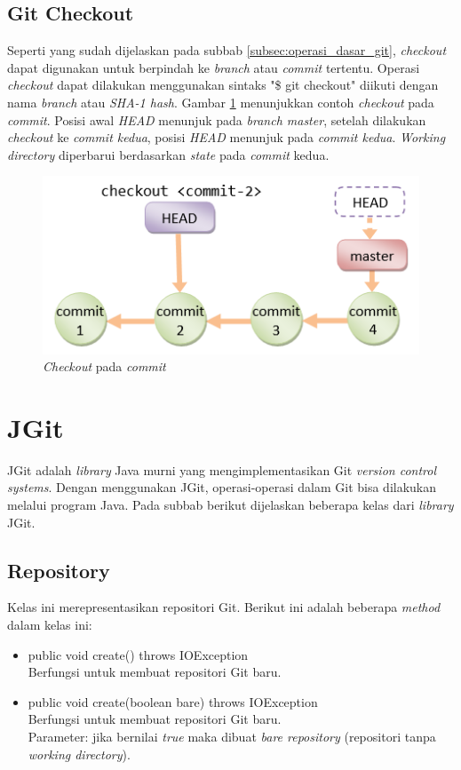 \subsection{Git Checkout}
Seperti yang sudah dijelaskan pada subbab \ref{subsec:operasi_dasar_git}, \textit{checkout} dapat digunakan untuk berpindah ke \textit{branch} atau \textit{commit} tertentu. Operasi \textit{checkout} dapat dilakukan menggunakan sintaks "\$ git checkout" diikuti dengan nama \textit{branch} atau \textit{SHA-1 hash}. Gambar \ref{fig:git_checkout} menunjukkan contoh \textit{checkout} pada \textit{commit}. Posisi awal \textit{HEAD} menunjuk pada \textit{branch master}, setelah dilakukan \textit{checkout} ke \textit{commit kedua}, posisi \textit{HEAD} menunjuk pada \textit{commit kedua}. \textit{Working directory} diperbarui berdasarkan \textit{state} pada \textit{commit} kedua. 
\begin{figure}[H]
	\centering
		\includegraphics[scale=0.7]{Gambar/gitcheckoutcommit.png}
	\caption{\textit{Checkout} pada \textit{commit}}
	\label{fig:git_checkout}
\end{figure}

\section{JGit}
\label{sec:jgit}
JGit adalah \textit{library} Java murni yang mengimplementasikan Git \textit{version control systems}\cite{JGit}. Dengan menggunakan JGit, operasi-operasi dalam Git bisa dilakukan melalui program Java. Pada subbab berikut dijelaskan beberapa kelas dari \textit{library} JGit. 

\subsection{Repository}
\label{subsec:repository}
Kelas ini merepresentasikan repositori Git\cite{JGit_java_doc}. Berikut ini adalah beberapa \textit{method} dalam kelas ini:
\begin{itemize}
\item public void create() throws IOException\\
Berfungsi untuk membuat repositori Git baru.
\item public void create(boolean bare) throws IOException\\
Berfungsi untuk membuat repositori Git baru. \\
Parameter: jika bernilai \textit{true} maka dibuat \textit{bare repository} (repositori tanpa \textit{working directory}). 
\end{itemize} 

